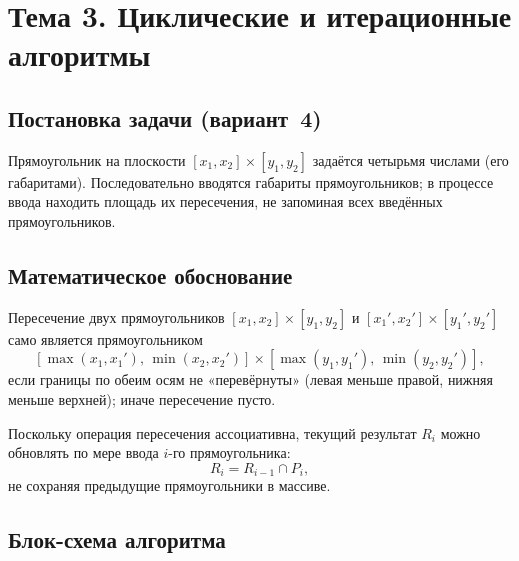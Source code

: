 \section{Тема 3. Циклические и итерационные алгоритмы}

\subsection{Постановка задачи (вариант~4)}

Прямоугольник на плоскости $[x_1,x_2]\times[y_1,y_2]$ задаётся
четырьмя числами (его габаритами). Последовательно вводятся
габариты прямоугольников; в процессе ввода находить площадь их
пересечения, не запоминая всех введённых прямоугольников.

\subsection{Математическое обоснование}

Пересечение двух прямоугольников
$[x_1,x_2]{\times}[y_1,y_2]$ и $[x_1',x_2']{\times}[y_1',y_2']$
само является прямоугольником
\[
  [\max(x_1,x_1'),\,\min(x_2,x_2')] \times
  [\max(y_1,y_1'),\,\min(y_2,y_2')],
\]
если границы по обеим осям не «перевёрнуты» (левая меньше правой,
нижняя меньше верхней); иначе пересечение пусто.

Поскольку операция пересечения ассоциативна, текущий результат
$R_i$ можно обновлять по мере ввода $i$-го прямоугольника:
\[
  R_i = R_{i-1} \cap P_i,
\]
не сохраняя предыдущие прямоугольники в массиве.

\subsection{Блок-схема алгоритма}

